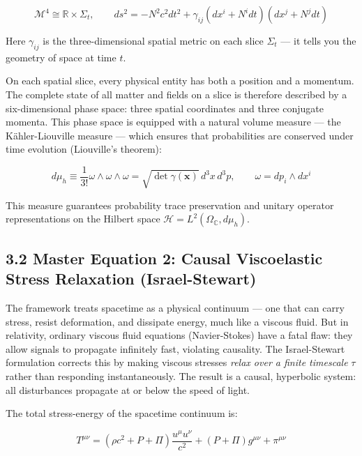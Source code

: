\documentclass[11pt,a4paper]{article}
\theoremstyle{definition}\newtheorem{definition}{Definition}
\theoremstyle{remark}\newtheorem{remark}{Remark}
\begin{document}
\begin{equation}
\mathcal{M}^4 \cong \mathbb{R} \times \Sigma_t, \qquad ds^2 = -N^2 c^2 dt^2 + \gamma_{ij}(dx^i + N^i dt)(dx^j + N^j dt)
\end{equation}


Here $\gamma_{ij}$ is the three-dimensional spatial metric on each slice $\Sigma_t$ — it tells you the geometry of space at time $t$.

On each spatial slice, every physical entity has both a position and a momentum. The complete state of all matter and fields on a slice is therefore described by a six-dimensional phase space: three spatial coordinates and three conjugate momenta. This phase space is equipped with a natural volume measure — the Kähler-Liouville measure — which ensures that probabilities are conserved under time evolution (Liouville's theorem):


\begin{equation}
\boxed{d\mu_h \equiv \frac{1}{3!} \omega \wedge \omega \wedge \omega = \sqrt{\det \gamma(\mathbf{x})} \, d^3x \, d^3p, \qquad \omega = dp_i \wedge dx^i}
\end{equation}


This measure guarantees probability trace preservation and unitary operator representations on the Hilbert space $\mathcal{H} = L^2(\Omega_{\mathbb{C}}, d\mu_h)$.
\subsection{3.2 Master Equation 2: Causal Viscoelastic Stress Relaxation (Israel-Stewart)}

The framework treats spacetime as a physical continuum — one that can carry stress, resist deformation, and dissipate energy, much like a viscous fluid. But in relativity, ordinary viscous fluid equations (Navier-Stokes) have a fatal flaw: they allow signals to propagate infinitely fast, violating causality. The Israel-Stewart formulation corrects this by making viscous stresses \textit{relax over a finite timescale} $\tau$ rather than responding instantaneously. The result is a causal, hyperbolic system: all disturbances propagate at or below the speed of light.

The total stress-energy of the spacetime continuum is:


\begin{equation}
T^{\mu\nu} = (\rho c^2 + P + \Pi) \frac{u^\mu u^\nu}{c^2} + (P + \Pi) g^{\mu\nu} + \pi^{\mu\nu}
\end{equation}
\end{document}
